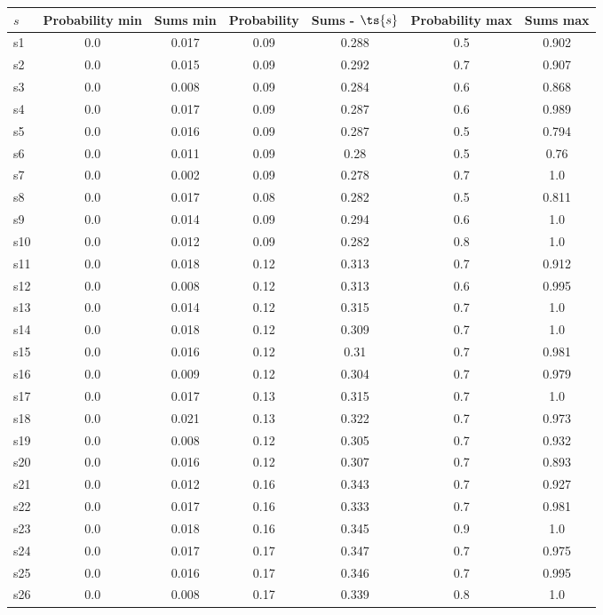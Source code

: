\documentclass{article}
\begin{document}
\noindent\begin{tabular}{|l|c|c|c|c|c|c|}
\hline
$s$& Probability min & Sums min & Probability & Sums - $\ts{s}$ & Probability max & Sums max\\
\hline
s1 &0.0 & 0.017 & 0.09 & 0.288 & 0.5 & 0.902\\
\hline
s2 &0.0 & 0.015 & 0.09 & 0.292 & 0.7 & 0.907\\
\hline
s3 &0.0 & 0.008 & 0.09 & 0.284 & 0.6 & 0.868\\
\hline
s4 &0.0 & 0.017 & 0.09 & 0.287 & 0.6 & 0.989\\
\hline
s5 &0.0 & 0.016 & 0.09 & 0.287 & 0.5 & 0.794\\
\hline
s6 &0.0 & 0.011 & 0.09 & 0.28 & 0.5 & 0.76\\
\hline
s7 &0.0 & 0.002 & 0.09 & 0.278 & 0.7 & 1.0\\
\hline
s8 &0.0 & 0.017 & 0.08 & 0.282 & 0.5 & 0.811\\
\hline
s9 &0.0 & 0.014 & 0.09 & 0.294 & 0.6 & 1.0\\
\hline
s10 &0.0 & 0.012 & 0.09 & 0.282 & 0.8 & 1.0\\
\hline
s11 &0.0 & 0.018 & 0.12 & 0.313 & 0.7 & 0.912\\
\hline
s12 &0.0 & 0.008 & 0.12 & 0.313 & 0.6 & 0.995\\
\hline
s13 &0.0 & 0.014 & 0.12 & 0.315 & 0.7 & 1.0\\
\hline
s14 &0.0 & 0.018 & 0.12 & 0.309 & 0.7 & 1.0\\
\hline
s15 &0.0 & 0.016 & 0.12 & 0.31 & 0.7 & 0.981\\
\hline
s16 &0.0 & 0.009 & 0.12 & 0.304 & 0.7 & 0.979\\
\hline
s17 &0.0 & 0.017 & 0.13 & 0.315 & 0.7 & 1.0\\
\hline
s18 &0.0 & 0.021 & 0.13 & 0.322 & 0.7 & 0.973\\
\hline
s19 &0.0 & 0.008 & 0.12 & 0.305 & 0.7 & 0.932\\
\hline
s20 &0.0 & 0.016 & 0.12 & 0.307 & 0.7 & 0.893\\
\hline
s21 &0.0 & 0.012 & 0.16 & 0.343 & 0.7 & 0.927\\
\hline
s22 &0.0 & 0.017 & 0.16 & 0.333 & 0.7 & 0.981\\
\hline
s23 &0.0 & 0.018 & 0.16 & 0.345 & 0.9 & 1.0\\
\hline
s24 &0.0 & 0.017 & 0.17 & 0.347 & 0.7 & 0.975\\
\hline
s25 &0.0 & 0.016 & 0.17 & 0.346 & 0.7 & 0.995\\
\hline
s26 &0.0 & 0.008 & 0.17 & 0.339 & 0.8 & 1.0\\

\end{tabular}
\end{document}
